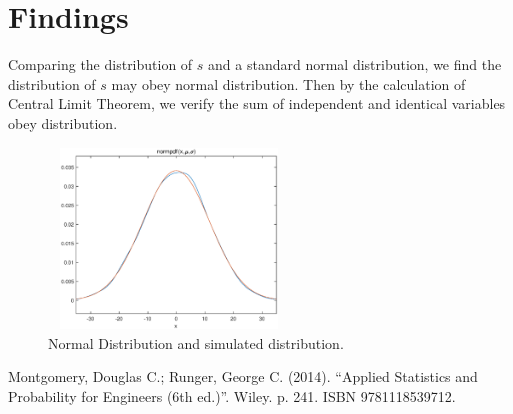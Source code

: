 \documentclass[conference]{IEEEtran}
\begin{document}
\section{Findings}
Comparing the distribution of $s$ and a standard normal distribution, we find the distribution of $s$ may obey normal distribution. Then by the calculation of Central Limit Theorem, we verify the sum of independent and identical variables obey distribution.

\begin{figure}[htbp]
\centering
\includegraphics[height=48mm,width=64mm]{distribution.eps}
\caption{Normal Distribution and simulated distribution. }
\centering
\label{fig:System_Model} \vspace{2mm}
\end{figure}


\begin{thebibliography}{00}
 Montgomery, Douglas C.; Runger, George C. (2014). “Applied Statistics and Probability for Engineers (6th ed.)”. Wiley. p. 241. ISBN 9781118539712.
\end{thebibliography}
\end{document}
